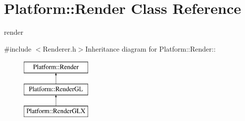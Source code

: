 \hypertarget{classPlatform_1_1Render}{
\section{Platform::Render Class Reference}
\label{classPlatform_1_1Render}
}


render  


{\ttfamily \#include $<$Renderer.h$>$}Inheritance diagram for Platform::Render::\begin{figure}[H]
\begin{center}
\leavevmode
\includegraphics[height=3cm]{classPlatform_1_1Render}
\end{center}
\end{figure}
